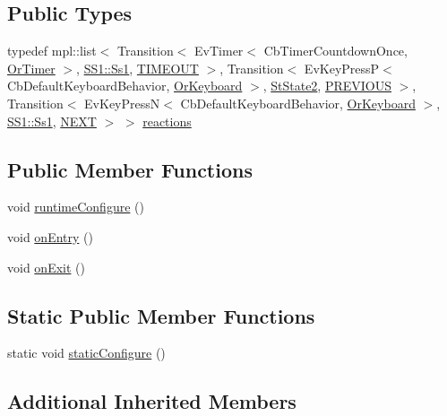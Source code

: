 \subsection*{Public Types}
\begin{DoxyCompactItemize}
\item 
typedef mpl\+::list$<$ Transition$<$ Ev\+Timer$<$ Cb\+Timer\+Countdown\+Once, \hyperlink{classsm__ferrari_1_1OrTimer}{Or\+Timer} $>$, \hyperlink{structsm__ferrari_1_1SS1_1_1Ss1}{S\+S1\+::\+Ss1}, \hyperlink{structsm__ferrari_1_1StState3_1_1TIMEOUT}{T\+I\+M\+E\+O\+UT} $>$, Transition$<$ Ev\+Key\+PressP$<$ Cb\+Default\+Keyboard\+Behavior, \hyperlink{classsm__ferrari_1_1OrKeyboard}{Or\+Keyboard} $>$, \hyperlink{structsm__ferrari_1_1StState2}{St\+State2}, \hyperlink{structsm__ferrari_1_1StState3_1_1PREVIOUS}{P\+R\+E\+V\+I\+O\+US} $>$, Transition$<$ Ev\+Key\+PressN$<$ Cb\+Default\+Keyboard\+Behavior, \hyperlink{classsm__ferrari_1_1OrKeyboard}{Or\+Keyboard} $>$, \hyperlink{structsm__ferrari_1_1SS1_1_1Ss1}{S\+S1\+::\+Ss1}, \hyperlink{structsm__ferrari_1_1StState3_1_1NEXT}{N\+E\+XT} $>$ $>$ \hyperlink{structsm__ferrari_1_1StState3_a0c20c276c250c63a6a130be48c457c10}{reactions}
\end{DoxyCompactItemize}
\subsection*{Public Member Functions}
\begin{DoxyCompactItemize}
\item 
void \hyperlink{structsm__ferrari_1_1StState3_aff80710783f94ee3d8d430da69c2a34f}{runtime\+Configure} ()
\item 
void \hyperlink{structsm__ferrari_1_1StState3_a1eb6cb90f31a755933a6f90c3b93da02}{on\+Entry} ()
\item 
void \hyperlink{structsm__ferrari_1_1StState3_a8daa8639391cb98bc3ba5ac146cd19ad}{on\+Exit} ()
\end{DoxyCompactItemize}
\subsection*{Static Public Member Functions}
\begin{DoxyCompactItemize}
\item 
static void \hyperlink{structsm__ferrari_1_1StState3_af8e946a7e28a4b5dbc43615a3e83b9db}{static\+Configure} ()
\end{DoxyCompactItemize}
\subsection*{Additional Inherited Members}


